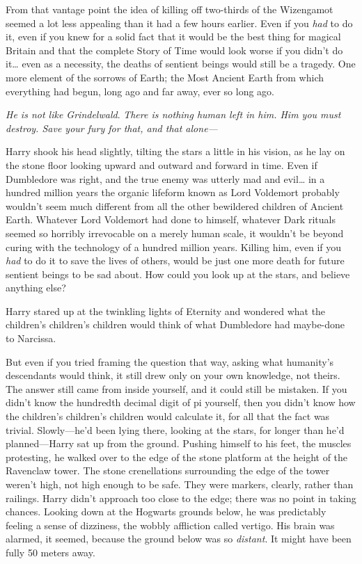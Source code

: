 From that vantage point the idea of killing off two-thirds of the Wizengamot 
seemed a lot less appealing than it had a few hours earlier. Even if you 
\emph{had} to do it, even if you knew for a solid fact that it would be the 
best thing for magical Britain and that the complete Story of Time would look 
worse if you didn't do it{\ldots} even as a necessity, the deaths of sentient 
beings would still be a tragedy. One more element of the sorrows of Earth; the 
Most Ancient Earth from which everything had begun, long ago and far away, ever 
so long ago.

\emph{He is not like Grindelwald}. \emph{There is nothing human left in him. 
Him you must destroy. Save your fury for that, and that alone---}

Harry shook his head slightly, tilting the stars a little in his vision, as he 
lay on the stone floor looking upward and outward and forward in time. Even if 
Dumbledore was right, and the true enemy was utterly mad and evil{\ldots} in a 
hundred million years the organic lifeform known as Lord Voldemort probably 
wouldn't seem much different from all the other bewildered children of Ancient 
Earth. Whatever Lord Voldemort had done to himself, whatever Dark rituals 
seemed so horribly irrevocable on a merely human scale, it wouldn't be beyond 
curing with the technology of a hundred million years. Killing him, even if you 
\emph{had} to do it to save the lives of others, would be just one more death 
for future sentient beings to be sad about. How could you look up at the stars, 
and believe anything else?

Harry stared up at the twinkling lights of Eternity and wondered what the 
children's children's children would think of what Dumbledore had maybe-done to 
Narcissa.

But even if you tried framing the question that way, asking what humanity's 
descendants would think, it still drew only on your own knowledge, not theirs. 
The answer still came from inside yourself, and it could still be mistaken. If 
you didn't know the hundredth decimal digit of pi yourself, then you didn't 
know how the children's children's children would calculate it, for all that 
the fact was trivial.
\sbreak
Slowly---he'd been lying there, looking at the stars, for longer than he'd 
planned---Harry sat up from the ground. Pushing himself to his feet, the 
muscles protesting, he walked over to the edge of the stone platform at the 
height of the Ravenclaw tower. The stone crenellations surrounding the edge of 
the tower weren't high, not high enough to be safe. They were markers, clearly, 
rather than railings. Harry didn't approach too close to the edge; there was no 
point in taking chances. Looking down at the Hogwarts grounds below, he was 
predictably feeling a sense of dizziness, the wobbly affliction called vertigo. 
His brain was alarmed, it seemed, because the ground below was so 
\emph{distant}. It might have been fully 50 meters away.

